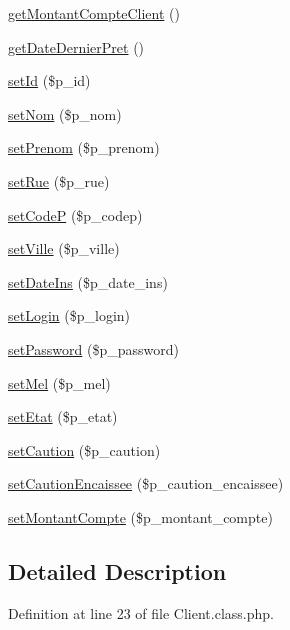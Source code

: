 \begin{DoxyCompactItemize}
\item 
\hyperlink{class_client_a1b9e3a8fd70187ddf7f8fabd58bb81f1}{get\+Montant\+Compte\+Client} ()
\item 
\hyperlink{class_client_a769e534725fbcf3bc437130dfd1c2430}{get\+Date\+Dernier\+Pret} ()
\item 
\hyperlink{class_client_ab2fff0fc655f96b6e5f4fcc294c49eee}{set\+Id} (\$p\+\_\+id)
\item 
\hyperlink{class_client_a64e05abe01ecd950dda832ceb8ad95a9}{set\+Nom} (\$p\+\_\+nom)
\item 
\hyperlink{class_client_a7bf9e7d18fd0cf6e38ffba353a5ad180}{set\+Prenom} (\$p\+\_\+prenom)
\item 
\hyperlink{class_client_a8c33cc68eacb9d49e95deb3e38779efd}{set\+Rue} (\$p\+\_\+rue)
\item 
\hyperlink{class_client_adaeb4fb4717afd2a42022d026f25bf1c}{set\+CodeP} (\$p\+\_\+codep)
\item 
\hyperlink{class_client_aaf173582a36fb4ebca1b382c302556d3}{set\+Ville} (\$p\+\_\+ville)
\item 
\hyperlink{class_client_a3c392997e2690d556e86fbca37a16d48}{set\+Date\+Ins} (\$p\+\_\+date\+\_\+ins)
\item 
\hyperlink{class_client_a9462cf04d3320cc2529d79e5648e61de}{set\+Login} (\$p\+\_\+login)
\item 
\hyperlink{class_client_aef4f2967c7fc72f354139c124fbe55f6}{set\+Password} (\$p\+\_\+password)
\item 
\hyperlink{class_client_ab0cbd09d000eb72455e26e25900a3f39}{set\+Mel} (\$p\+\_\+mel)
\item 
\hyperlink{class_client_a21154c09e82e11def93b643adb6a39fe}{set\+Etat} (\$p\+\_\+etat)
\item 
\hyperlink{class_client_aa2f92cdad1e4db9596a3f5804cbe70e4}{set\+Caution} (\$p\+\_\+caution)
\item 
\hyperlink{class_client_a11c434331e2518272593e8cec6ce53c9}{set\+Caution\+Encaissee} (\$p\+\_\+caution\+\_\+encaissee)
\item 
\hyperlink{class_client_a7b29388deb98bceec710261439234709}{set\+Montant\+Compte} (\$p\+\_\+montant\+\_\+compte)
\end{DoxyCompactItemize}


\subsection{Detailed Description}


Definition at line 23 of file Client.\+class.\+php.



